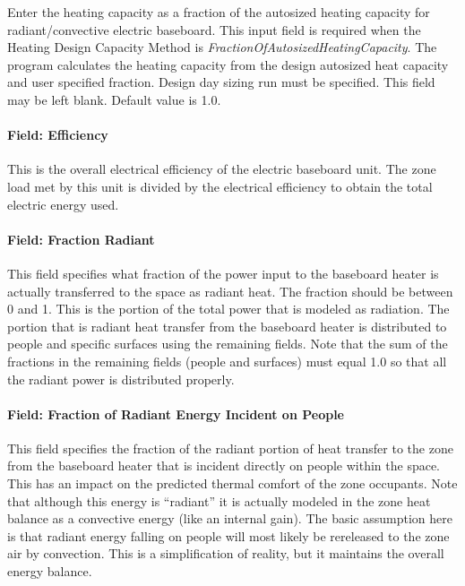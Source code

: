 Enter the heating capacity as a fraction of the autosized heating capacity for radiant/convective electric baseboard. This input field is required when the Heating Design Capacity Method is \emph{FractionOfAutosizedHeatingCapacity}. The program calculates the heating capacity from the design autosized heat capacity and user specified fraction. Design day sizing run must be specified. This field may be left blank. Default value is 1.0.

\paragraph{Field: Efficiency}\label{field-efficiency-001}

This is the overall electrical efficiency of the electric baseboard unit. The zone load met by this unit is divided by the electrical efficiency to obtain the total electric energy used.

\paragraph{Field: Fraction Radiant}\label{field-fraction-radiant-2-000}

This field specifies what fraction of the power input to the baseboard heater is actually transferred to the space as radiant heat. The fraction should be between 0 and 1. This is the portion of the total power that is modeled as radiation. The portion that is radiant heat transfer from the baseboard heater is distributed to people and specific surfaces using the remaining fields. Note that the sum of the fractions in the remaining fields (people and surfaces) must equal 1.0 so that all the radiant power is distributed properly.

\paragraph{Field: Fraction of Radiant Energy Incident on People}\label{field-fraction-of-radiant-energy-incident-on-people-2}

This field specifies the fraction of the radiant portion of heat transfer to the zone from the baseboard heater that is incident directly on people within the space. This has an impact on the predicted thermal comfort of the zone occupants. Note that although this energy is ``radiant'' it is actually modeled in the zone heat balance as a convective energy (like an internal gain). The basic assumption here is that radiant energy falling on people will most likely be rereleased to the zone air by convection. This is a simplification of reality, but it maintains the overall energy balance.

